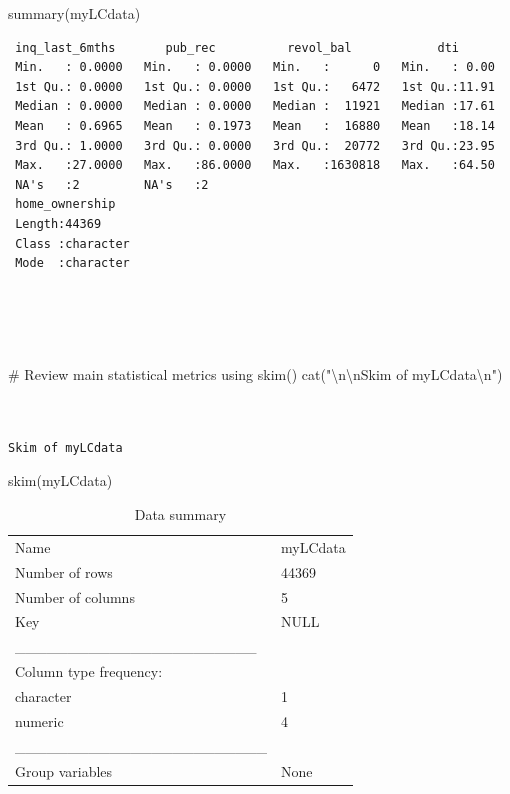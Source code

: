 \documentclass[
  letterpaper,
  DIV=11,
  numbers=noendperiod]{scrartcl}
\newenvironment{Shaded}{\begin{snugshade}}{\end{snugshade}}
\newcommand{\CommentTok}[1]{\textcolor[rgb]{0.37,0.37,0.37}{#1}}
\newcommand{\FunctionTok}[1]{\textcolor[rgb]{0.28,0.35,0.67}{#1}}
\newcommand{\NormalTok}[1]{\textcolor[rgb]{0.00,0.23,0.31}{#1}}
\newcommand{\SpecialCharTok}[1]{\textcolor[rgb]{0.37,0.37,0.37}{#1}}
\newcommand{\StringTok}[1]{\textcolor[rgb]{0.13,0.47,0.30}{#1}}
\begin{document}
\begin{Shaded}
\begin{Highlighting}[]
\FunctionTok{summary}\NormalTok{(myLCdata)}
\end{Highlighting}
\end{Shaded}

\begin{verbatim}
 inq_last_6mths       pub_rec          revol_bal            dti       
 Min.   : 0.0000   Min.   : 0.0000   Min.   :      0   Min.   : 0.00  
 1st Qu.: 0.0000   1st Qu.: 0.0000   1st Qu.:   6472   1st Qu.:11.91  
 Median : 0.0000   Median : 0.0000   Median :  11921   Median :17.61  
 Mean   : 0.6965   Mean   : 0.1973   Mean   :  16880   Mean   :18.14  
 3rd Qu.: 1.0000   3rd Qu.: 0.0000   3rd Qu.:  20772   3rd Qu.:23.95  
 Max.   :27.0000   Max.   :86.0000   Max.   :1630818   Max.   :64.50  
 NA's   :2         NA's   :2                                          
 home_ownership    
 Length:44369      
 Class :character  
 Mode  :character  
                   
                   
                   
                   
\end{verbatim}

\begin{Shaded}
\begin{Highlighting}[]
\CommentTok{\# Review main statistical metrics using skim()}
\FunctionTok{cat}\NormalTok{(}\StringTok{"}\SpecialCharTok{\textbackslash{}n\textbackslash{}n}\StringTok{Skim of myLCdata}\SpecialCharTok{\textbackslash{}n}\StringTok{"}\NormalTok{)}
\end{Highlighting}
\end{Shaded}

\begin{verbatim}


Skim of myLCdata
\end{verbatim}

\begin{Shaded}
\begin{Highlighting}[]
\FunctionTok{skim}\NormalTok{(myLCdata)}
\end{Highlighting}
\end{Shaded}

\begin{longtable}[]{@{}ll@{}}
\caption{Data summary}\tabularnewline
\toprule\noalign{}
\endfirsthead
\endhead
\bottomrule\noalign{}
\endlastfoot
Name & myLCdata \\
Number of rows & 44369 \\
Number of columns & 5 \\
Key & NULL \\
\_\_\_\_\_\_\_\_\_\_\_\_\_\_\_\_\_\_\_\_\_\_\_ & \\
Column type frequency: & \\
character & 1 \\
numeric & 4 \\
\_\_\_\_\_\_\_\_\_\_\_\_\_\_\_\_\_\_\_\_\_\_\_\_ & \\
Group variables & None \\
\end{longtable}
\end{document}

